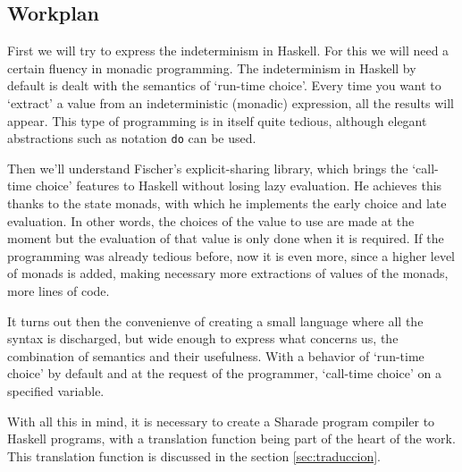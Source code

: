 \documentclass[class=article, crop=false]{standalone}
\begin{document}
\subsection{Workplan}
First we will try to express the indeterminism in Haskell. For this we will need a certain
fluency in monadic programming.  The indeterminism in Haskell by default is dealt with the
semantics of `run-time choice'. Every time you want to `extract' a value from an
indeterministic (monadic) expression, all the results will appear. This type of programming
is in itself quite tedious, although elegant abstractions such as notation \verb`do` can be
used.

Then we'll understand Fischer's explicit-sharing library, which brings the `call-time choice'
features to Haskell without losing lazy evaluation. He achieves this thanks to the state
monads, with which he implements the early choice and late evaluation. In other words, the
choices of the value to use are made at the moment but the evaluation of that value is only
done when it is required. If the programming was already tedious before, now it is even more,
since a higher level of monads is added, making necessary more extractions of values of the
monads, more lines of code.

It turns out then the convenienve of creating a small language where all the syntax is
discharged, but wide enough to express what concerns us, the combination of semantics and
their usefulness. With a behavior of `run-time choice' by default and at the request of the
programmer, `call-time choice' on a specified variable.

With all this in mind, it is necessary to create a Sharade program compiler to Haskell
programs, with a translation function being part of the heart of the work. This translation
function is discussed in the section \ref{sec:traduccion}.
\end{document}
